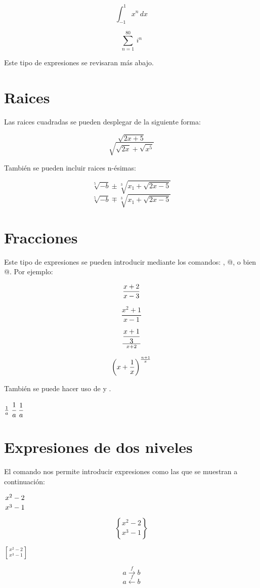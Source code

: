 \documentclass[letterpaper,12pt]{article}
\begin{document}
$$ \int_{-1}^{1} x^n \, dx $$

$$ \sum_{n=1}^{80} \, i^n $$

Este tipo de expresiones se revisaran más abajo.

\section{Raices}

Las raices cuadradas se pueden desplegar de la siguiente forma:

$$\sqrt{2 x + 5}$$
$$\sqrt{\sqrt{2 x} + \sqrt{x^5}}$$

También se pueden incluir raices n-ésimas:

$$\sqrt[5]{-b} \pm \sqrt[3]{x_1 + \sqrt{2 x -5}}$$
$$\sqrt[5]{-b} \mp \sqrt[3]{x_1 + \sqrt{2 x -5}}$$

\section{Fracciones}

Este tipo de expresiones se pueden introducir mediante los comandos: \verb@\over@, \verb@\frac{}{}@, o bien \verb@{ \atop }@. Por ejemplo:

$${x+2 \over x-3}$$

\[ \frac{x^2 + 1}{x-1}\]

\[ {{x + 1}\over{3}} \over {x+2} \]

$${\left( x + {1 \over x} \right)^{n+1 \over x}}$$

También se puede hacer uso de \verb@\cfrac@ y \verb@\dfrac@.

$\frac{1}{a} \,\, \cfrac{1}{a} \,\, \dfrac{1}{a}$

\section{Expresiones de dos niveles}

El comando \verb@\atop@ nos permite introducir expresiones como las que se muestran a continuación:

$\displaystyle {x^2-2 \atop x^3-1}$

$${x^2-2 \brace x^3-1}$$

$\displaystyle {x^2-2 \brack x^3-1}$

$${a \stackrel{f}{\rightarrow} b}$$
$${a \stackrel{f}{\leftarrow} b}$$

\end{document}
